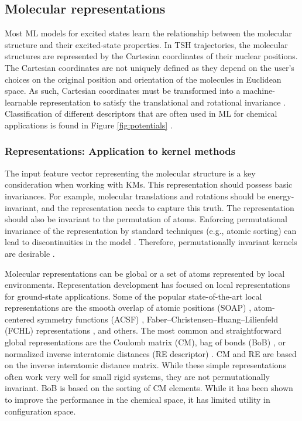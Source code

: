 \documentclass[9pt,bestpractices]{livecoms}
\begin{document}
\subsection{Molecular representations}
\label{sec:repre}

Most ML models for excited states learn the relationship between the molecular structure and their excited-state properties. In TSH trajectories, the molecular structures are represented by the Cartesian coordinates of their nuclear positions. The Cartesian coordinates are not uniquely defined as they depend on the user’s choices on the original position and orientation of the molecules in Euclidean space. As such, Cartesian coordinates must be transformed into a machine-learnable representation to satisfy the translational and rotational invariance \cite{RN136, RN33}. Classification of different descriptors that are often used in ML for chemical applications is found in Figure \ref{fig:potentials} \cite{RN39}.

\subsubsection{Representations: Application to kernel methods}
\label{sec:kernelrep}
The input feature vector representing the molecular structure is a key consideration when working with KMs. This representation should possess basic invariances. For example, molecular translations and rotations should be energy-invariant, and the representation needs to capture this truth. The representation should also be invariant to the permutation of atoms. Enforcing permutational invariance of the representation by standard techniques (e.g., atomic sorting) can lead to discontinuities in the model \cite{RN32}. Therefore, permutationally invariant kernels are desirable \cite{RN149, RN31}.

Molecular representations can be global or a set of atoms represented by local environments. Representation development has focused on local representations for ground-state applications. Some of the popular state-of-the-art local representations are the smooth overlap of atomic positions (SOAP) \cite{RN156}, atom-centered symmetry functions (ACSF) \cite{RN30}, Faber–Christensen–Huang–Lilienfeld (FCHL) representations \cite{RN29}, and others. The most common and straightforward global representations are the Coulomb matrix (CM), bag of bonds (BoB) \cite{RN137}, or normalized inverse interatomic distances (RE descriptor) \cite{RN149}. CM and RE are based on the inverse interatomic distance matrix. While these simple representations often work very well for small rigid systems, they are not permutationally invariant. BoB is based on the sorting of CM elements. While it has been shown to improve the performance in the chemical space, it has limited utility in configuration space. 
\end{document}
